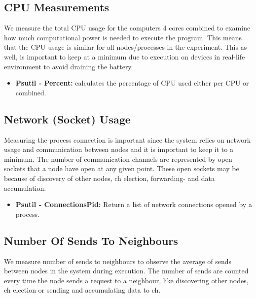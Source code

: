 \documentclass[USenglish]{uit-thesis}
\begin{document}
\subsection{CPU Measurements} \label{eva:cpu_measure}
We measure the total CPU usage for the computers 4 cores combined to examine how much computational power is needed to execute the program. This means that the CPU usage is similar for all nodes/processes in the experiment.
This as well, is important to keep at a minimum due to execution on devices in real-life environment to avoid draining the battery.


\begin{itemize}
\item \textbf{Psutil - Percent:} calculates the percentage of CPU used either per CPU or combined.
\end{itemize}


\subsection{Network (Socket) Usage} \label{eva:net_measure}

Measuring the process connection is important since the system relies on network usage and communication between nodes and it is important to keep it to a minimum. The number of communication channels are represented by open sockets that a node have open at any given point. These open sockets may be because of discovery of other nodes, \gls{ch} election, forwarding- and data accumulation.

\begin{itemize}
\item \textbf{Psutil - ConnectionsPid:} Return a list of network connections opened by a process.
\end{itemize}



\subsection{Number Of Sends To Neighbours}
We measure number of sends to neighbours to observe the average of sends between nodes in the system during execution. The number of sends are counted every time the node sends a request to a neighbour, like discovering other nodes, \gls{ch} election or sending and accumulating data to \gls{ch}.
\end{document}
